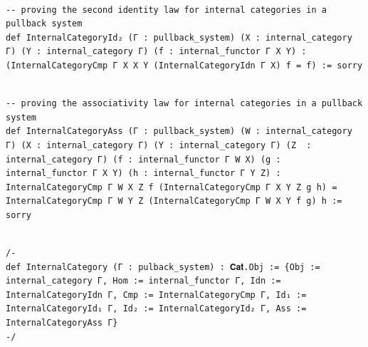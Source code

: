 \documentclass{book}
\theoremstyle{definition}
\newcounter{lcounter}
\begin{document}
\begin{center}
\begin{tcolorbox}[width=5in,colback={white},title={\begin{center}\texttt{Lean \thelcounter} \addtocounter{lcounter}{1}  \end{center}},colbacktitle=Blue,coltitle=black]
\begin{verbatim}

-- proving the second identity law for internal categories in a pullback system
def InternalCategoryId₂ (Γ : pullback_system) (X : internal_category Γ) (Y : internal_category Γ) (f : internal_functor Γ X Y) : (InternalCategoryCmp Γ X X Y (InternalCategoryIdn Γ X) f = f) := sorry

\end{verbatim}
\end{tcolorbox}
\end{center}

\begin{center}
\begin{tcolorbox}[width=5in,colback={white},title={\begin{center}\texttt{Lean \thelcounter} \addtocounter{lcounter}{1}  \end{center}},colbacktitle=Blue,coltitle=black]
\begin{verbatim}

-- proving the associativity law for internal categories in a pullback system
def InternalCategoryAss (Γ : pullback_system) (W : internal_category Γ) (X : internal_category Γ) (Y : internal_category Γ) (Z  : internal_category Γ) (f : internal_functor Γ W X) (g : internal_functor Γ X Y) (h : internal_functor Γ Y Z) : InternalCategoryCmp Γ W X Z f (InternalCategoryCmp Γ X Y Z g h) = InternalCategoryCmp Γ W Y Z (InternalCategoryCmp Γ W X Y f g) h := sorry

\end{verbatim}
\end{tcolorbox}
\end{center}

\begin{center}
\begin{tcolorbox}[width=5in,colback={white},title={\begin{center}\texttt{Lean \thelcounter} \addtocounter{lcounter}{1}  \end{center}},colbacktitle=Blue,coltitle=black]
\begin{verbatim}

/-
def InternalCategory (Γ : pulback_system) : 𝐂𝐚𝐭.Obj := {Obj := internal_category Γ, Hom := internal_functor Γ, Idn := InternalCategoryIdn Γ, Cmp := InternalCategoryCmp Γ, Id₁ := InternalCategoryId₁ Γ, Id₂ := InternalCategoryId₂ Γ, Ass := InternalCategoryAss Γ}
-/

\end{verbatim}
\end{tcolorbox}
\end{center}
\end{document}
